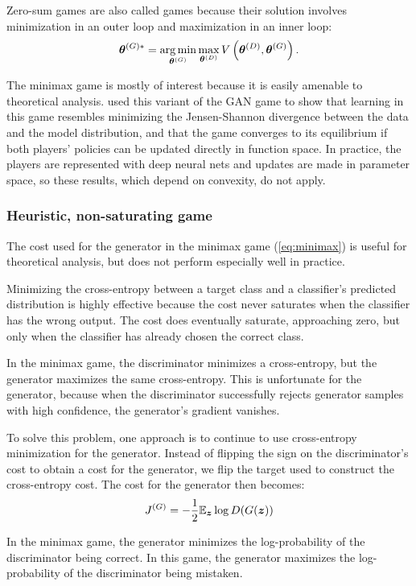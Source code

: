 Zero-sum games are also called  games because their solution involves minimization
in an outer loop and maximization in an inner loop:
\[ {\bm{\theta}}^{(G)*} = \operatorname*{arg\,min}_{{\bm{\theta}}^{(G)}} \max_{{\bm{\theta}}^{(D)}} V\left({\bm{\theta}}^{(D)}, {\bm{\theta}}^{(G)} \right) . \]

The minimax game is mostly of interest because it is easily amenable to theoretical analysis.
\citet{Goodfellow-et-al-NIPS2014-small} used this variant of the GAN game to show that learning in
this game resembles minimizing the Jensen-Shannon divergence between the data and the model distribution,
and that the game converges to its equilibrium if both players' policies can be updated directly in
function space.
In practice, the players are represented with deep neural nets and updates are made in parameter space,
so these results, which depend on convexity, do not apply.

\subsubsection{Heuristic, non-saturating game}

The cost used for the generator in the minimax game (\eqref{eq:minimax}) is useful for theoretical analysis,
but does not perform especially well in practice.

Minimizing the cross-entropy between a target class and a classifier's predicted distribution
is highly effective because the cost never saturates when the classifier has the wrong output.
The cost does eventually saturate, approaching zero, but only when the classifier has already
chosen the correct class.

In the minimax game, the discriminator minimizes a cross-entropy, but the generator maximizes
the same cross-entropy.
This is unfortunate for the generator, because when the discriminator successfully rejects
generator samples with high confidence, the generator's gradient vanishes.

To solve this problem, one approach is to continue to use cross-entropy minimization for the
generator.
Instead of flipping the sign on the discriminator's cost to obtain a cost for the generator,
we flip the target used to construct the cross-entropy cost.
The cost for the generator then becomes:
\[
  J^{(G)} = -\frac{1}{2} \mathbb{E}_{\bm{z}} \log D(G({\bm{z}}))
\]

In the minimax game, the generator minimizes the log-probability of the discriminator being correct.
In this game, the generator maximizes the log-probability of the discriminator being mistaken.

